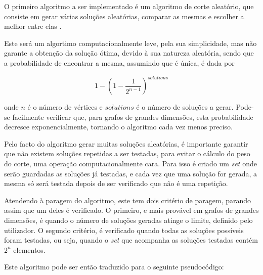 \documentclass[mirror, portugues]{revdetua}
\begin{document}
O primeiro algoritmo a ser implementado é um algoritmo de corte aleatório, que consiste em gerar várias soluções aleatórias, comparar as mesmas e escolher a melhor entre elas \cite{AG14}.

Este será um algortimo computacionalmente leve, pela sua simplicidade, mas não garante a obtenção da solução ótima, devido à sua natureza aleatória, sendo que a probabilidade de encontrar a mesma, assumindo que é única, é dada por

$$1 - \left( 1 - \frac{1}{2^{n-1}} \right)^{solutions}$$

\noindent onde $n$ é o número de vértices e $solutions$ é o número de soluções a gerar. Pode-se facilmente verificar que, para grafos de grandes dimensões, esta probabilidade decresce exponencialmente, tornando o algoritmo cada vez menos preciso.

Pelo facto do algoritmo gerar muitas soluções aleatórias, é importante garantir que não existem soluções repetidas a ser testadas, para evitar o cálculo do peso do corte, uma operação computacionalmente cara. Para isso é criado um \textit{set} onde serão guardadas as soluções já testadas, e cada vez que uma solução for gerada, a mesma só será testada depois de ser verificado que não é uma repetição. 

Atendendo à paragem do algoritmo, este tem dois critério de paragem, parando assim que um deles é verificado. O primeiro, e mais provável em grafos de grandes dimensões, é quando o número de soluções geradas atinge o limite, definido pelo utilizador. O segundo critério, é verificado quando todas as soluções possíveis foram testadas, ou seja, quando o \textit{set} que acompanha as soluções testadas contém $2^n$ elementos.

Este algoritmo pode ser então traduzido para o seguinte pseudocódigo:
\end{document}
